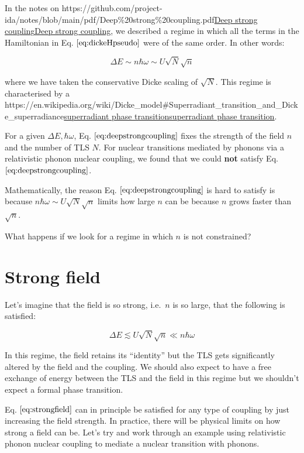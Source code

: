 \documentclass[
]{article}
\let\oldhref\href
\renewcommand{\href}[2]{\ifx#1\urlprefix\oldhref{#1}{#2}\else\uline{\oldhref{#1}{#2}}\fi}
\renewcommand{\[}{\begin{equation}}
\renewcommand{\]}{\end{equation}}
\begin{document}
In the notes on
\href{https://github.com/project-ida/notes/blob/main/pdf/Deep\%20strong\%20coupling.pdf}{Deep
strong coupling}, we described a regime in which all the terms in the
Hamiltonian in Eq. \(\ref{eq:dickeHpseudo}\) were of the same order. In
other words:

\[
\Delta E \sim n\hbar\omega \sim U\sqrt{N}\sqrt{n}
\label{eq:deepstrongcoupling}
\]

where we have taken the conservative Dicke scaling of \(\sqrt{N}\). This
regime is characterised by a
\href{https://en.wikipedia.org/wiki/Dicke_model\#Superradiant_transition_and_Dicke_superradiance}{superradiant
phase transition}.

For a given \(\Delta E, \hbar\omega\), Eq.
\(\ref{eq:deepstrongcoupling}\) fixes the strength of the field \(n\)
and the number of TLS \(N\). For nuclear transitions mediated by phonons
via a relativistic phonon nuclear coupling, we found that we could
\textbf{not} satisfy Eq. \(\ref{eq:deepstrongcoupling}\).

Mathematically, the reason Eq. \(\ref{eq:deepstrongcoupling}\) is hard
to satisfy is because \(n\hbar\omega \sim U\sqrt{N}\sqrt{n}\) limits how
large \(n\) can be because \(n\) grows faster than \(\sqrt{n}\).

What happens if we look for a regime in which \(n\) is not constrained?

\section{Strong field}\label{strong-field}

Let's imagine that the field is so strong, i.e.~\(n\) is so large, that
the following is satisfied:

\[
\Delta E \lesssim U\sqrt{N}\sqrt{n} \ll n\hbar \omega
\label{eq:strongfield}
\]

In this regime, the field retains its ``identity'' but the TLS gets
significantly altered by the field and the coupling. We should also
expect to have a free exchange of energy between the TLS and the field
in this regime but we shouldn't expect a formal phase transition.

Eq. \(\ref{eq:strongfield}\) can in principle be satisfied for any type
of coupling by just increasing the field strength. In practice, there
will be physical limits on how strong a field can be. Let's try and work
through an example using relativistic phonon nuclear coupling to mediate
a nuclear transition with phonons.
\end{document}
